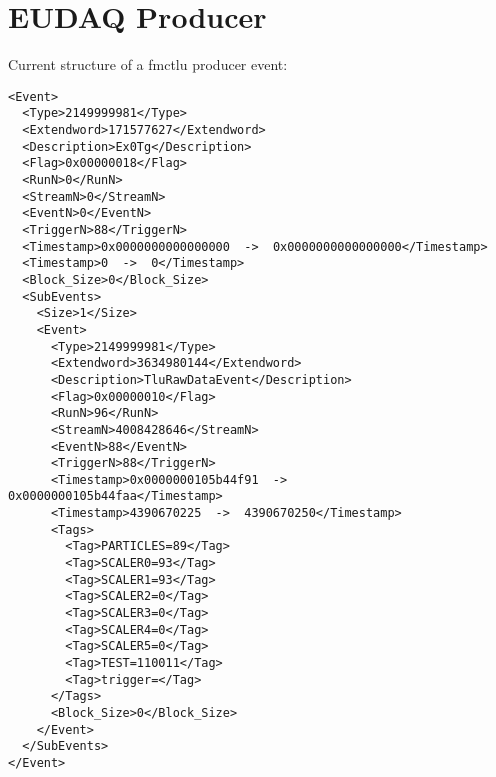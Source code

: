 \chapter{EUDAQ Producer}\label{ch:eudaqprod}
Current structure of a fmctlu producer event:
\lstset{language=XML}
\scriptsize 
\begin{lstlisting}
<Event>
  <Type>2149999981</Type>
  <Extendword>171577627</Extendword>
  <Description>Ex0Tg</Description>
  <Flag>0x00000018</Flag>
  <RunN>0</RunN>
  <StreamN>0</StreamN>
  <EventN>0</EventN>
  <TriggerN>88</TriggerN>
  <Timestamp>0x0000000000000000  ->  0x0000000000000000</Timestamp>
  <Timestamp>0  ->  0</Timestamp>
  <Block_Size>0</Block_Size>
  <SubEvents>
    <Size>1</Size>
    <Event>
      <Type>2149999981</Type>
      <Extendword>3634980144</Extendword>
      <Description>TluRawDataEvent</Description>
      <Flag>0x00000010</Flag>
      <RunN>96</RunN>
      <StreamN>4008428646</StreamN>
      <EventN>88</EventN>
      <TriggerN>88</TriggerN>
      <Timestamp>0x0000000105b44f91  ->  0x0000000105b44faa</Timestamp>
      <Timestamp>4390670225  ->  4390670250</Timestamp>
      <Tags>
        <Tag>PARTICLES=89</Tag>
        <Tag>SCALER0=93</Tag>
        <Tag>SCALER1=93</Tag>
        <Tag>SCALER2=0</Tag>
        <Tag>SCALER3=0</Tag>
        <Tag>SCALER4=0</Tag>
        <Tag>SCALER5=0</Tag>
        <Tag>TEST=110011</Tag>
        <Tag>trigger=</Tag>
      </Tags>
      <Block_Size>0</Block_Size>
    </Event>
  </SubEvents>
</Event>
\end{lstlisting}
\normalsize
